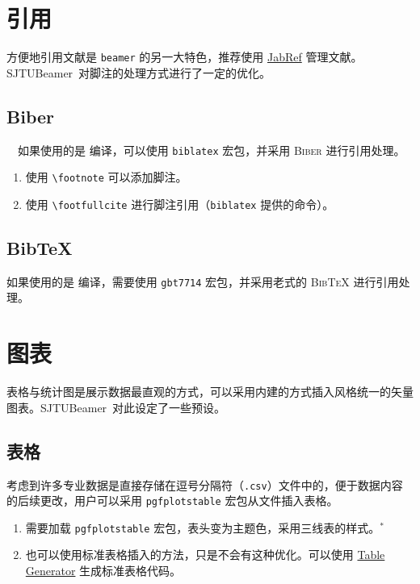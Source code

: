 \documentclass[
    UTF8,
    heading=true,
    12pt,
    a4paper
]{ctexrep}
\newenvironment{commentlist}{\begin{enumerate}\small}{\end{enumerate}}
\def\themename{\textsf{SJTUBeamer}}
\begin{document}
\chapter{引用}

方便地引用文献是 \texttt{beamer} 的另一大特色，推荐使用 \href{https://www.jabref.org/}{JabRef} 管理文献。\themename\ 对脚注的处理方式进行了一定的优化。

\section{Biber}

\faApple\ \faLinux\ 如果使用的是  编译，可以使用 \texttt{biblatex} 宏包，并采用 \textsc{Biber} 进行引用处理。


\begin{commentlist}
  \item 使用 \texttt{\textbackslash{}footnote} 可以添加脚注。
  \item 使用 \texttt{\textbackslash{}footfullcite} 进行脚注引用（\texttt{biblatex} 提供的命令）。
\end{commentlist}

\section{Bib\TeX{}}

\faWindows 如果使用的是  编译，需要使用 \texttt{gbt7714} 宏包，并采用老式的 \textsc{Bib\TeX{}} 进行引用处理。

\chapter{图表}

表格与统计图是展示数据最直观的方式，可以采用内建的方式插入风格统一的矢量图表。\themename\ 对此设定了一些预设。

\section{表格}

考虑到许多专业数据是直接存储在逗号分隔符（\texttt{.csv}）文件中的，便于数据内容的后续更改，用户可以采用 \texttt{pgfplotstable} 宏包从文件插入表格。


\begin{commentlist}
  \item 需要加载 \texttt{pgfplotstable} 宏包，表头变为主题色，采用三线表的样式。$^*$
  \item 也可以使用标准表格插入的方法，只是不会有这种优化。可以使用 \href{https://www.tablesgenerator.com/latex_tables}{Table Generator} 生成标准表格代码。
\end{commentlist}
\end{document}

